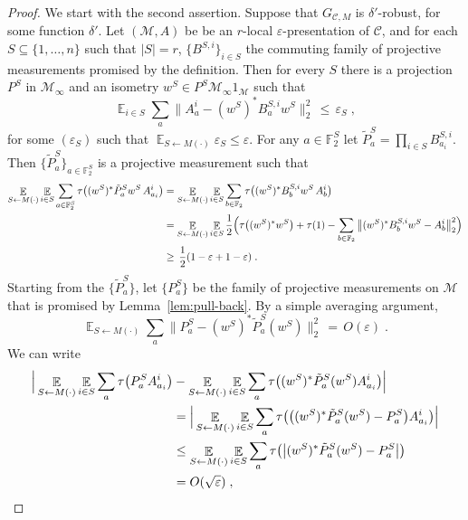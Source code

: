 \documentclass[11pt]{article}
\theoremstyle{definition}
\newcommand{\code}{\mathcal{C}}
\DeclareMathOperator*{\Expectation}{\mathbb{E}}
\newcommand{\Es}[1]{\Expectation_{#1}}
\newcommand{\field}{\mathbb{F}_2}
\newcommand{\mM}{\ensuremath{\mathcal{M}}}
\newcommand{\eps}{\varepsilon}
\begin{document}
\begin{proof}
We start with the second assertion. Suppose that $G_{\code,M}$ is $\delta'$-robust, for some function $\delta'$. Let $(\mM,A)$ be be an $r$-local $\eps$-presentation of $\code$, and for each $S\subseteq\{1,\ldots,n\}$ such that $|S|=r$, $\{B^{S,i}\}_{i\in S}$ the commuting family of projective measurements promised by the definition. Then for every $S$ there is a projection $P^S$ in $\mM_\infty$ and an isometry $w^S\in P^S \mM_\infty 1_\mM$ such that 
\[ \Es{i\in S} \sum_a \big\| A^i_a - (w^S)^* B^{S,i}_{a}w^S \big\|_2^2 \,\leq\,\eps_S\;,\]
for some $(\eps_S)$ such that $\Es{S\leftarrow M(\cdot)} \eps_S \leq \eps$. 
 For any $a\in\field^S$ let $\tilde{P}^S_a = \prod_{i\in S} B^{S,i}_{a_i}$. Then $\{\tilde{P}^S_a\}_{a\in\field^S}$ is a projective measurement such that
\begin{align}
\Es{S\leftarrow M(\cdot)} \Es{i\in S} \sum_{a\in \field^S} \tau\big(  (w^S)^* \tilde{P}^S_a w^S \, A^i_{a_i}\big) 
&= \Es{S\leftarrow M(\cdot)} \Es{i\in S} \sum_{b\in \field}\tau\big(  (w^S)^* B^{S,i}_b w^S\, A^i_{b}\big)\notag \\
&= \Es{S\leftarrow M(\cdot)} \Es{i\in S} \frac{1}{2}\Big(\tau\big((w^S)^*w^S\big) + \tau(1) - \sum_{b\in \field} \big\|  (w^S)^* B^{S,i}_b w^S - A^i_{b}\big\|_2^2\Big) \notag\\
&\geq \,\frac{1}{2}(1-\eps+1-\eps)\;.\label{eq:s-g-1}
\end{align}
Starting from the $\{\tilde{P}^S_a\}$, let $\{P^S_a\}$ be the family of projective measurements on $\mM$ that is promised by Lemma~\ref{lem:pull-back}. By a simple averaging argument,
\begin{equation}\label{eq:s-g-1b}
\Es{S\leftarrow M(\cdot)}\sum_a \big\| P^S_a - (w^S)^* \tilde{P}^S_a (w^S)\big\|_2^2 \,=\, O(\eps)\;. 
\end{equation}
We can write
\begin{align}
\Big|\Es{S\leftarrow M(\cdot)} \Es{i\in S} \sum_a \tau\big( P^S_a A^i_{a_i}\big)
&- \Es{S\leftarrow M(\cdot)} \Es{i\in S} \sum_a \tau\big( (w^S)^* \tilde{P}^S_a (w^S)A^i_{a_i}\big)\Big|\notag\\
&= \Big| \Es{S\leftarrow M(\cdot)} \Es{i\in S} \sum_a \tau\big(\big((w^S)^* \tilde{P}^S_a (w^S)-P^S_a\big)A^i_{a_i}\big)\Big|\notag\\
&\leq \Es{S\leftarrow M(\cdot)} \Es{i\in S} \sum_a \tau\big(\big|(w^S)^* \tilde{P}^S_a (w^S)-P^S_a\big|\big)\notag\\
&= O(\sqrt{\eps})\;,\label{eq:s-g-2}
\end{align}

\end{proof}
\end{document}
